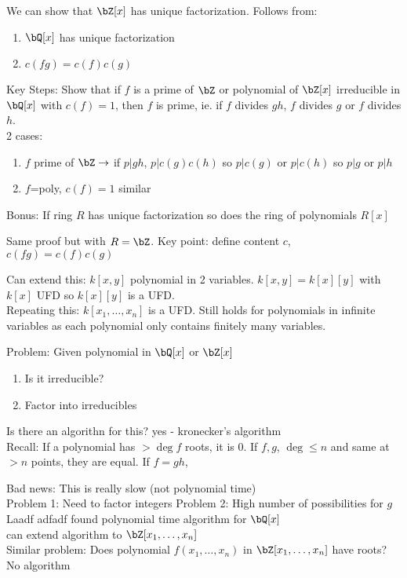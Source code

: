  \noindent
 We can show that $\bZ[x]$ has unique factorization. Follows from: 
 \begin{enumerate}
    \item $\bQ[x]$ has unique factorization 
    \item $c(fg)=c(f)c(g)$ 
 \end{enumerate}
Key Steps: Show that if $f$ is a prime of $\bZ$ or polynomial of $\bZ[x]$ irreducible in $\bQ[x]$ with $c(f)=1$, then $f$ is prime, ie. if $f$ divides $gh$, $f$ divides $g$ or $f$ divides $h$. \\
2 cases: 
\begin{enumerate}
    \item $f$ prime of $\bZ \to$ if $p|gh$, $p|c(g)c(h)$ so $p|c(g)$ or $p|c(h)$ so $p|g$ or $p|h$ 
    \item $f$=poly, $c(f)=1$ similar 
\end{enumerate}

\noindent
Bonus: If ring $R$ has unique factorization so does the ring of polynomials $R[x]$ 

\begin{pf}
    Same proof but with $R = \bZ$. Key point: define content $c$, $c(fg) = c(f)c(g)$ 
\end{pf}    

\noindent
Can extend this: $k[x,y]$ polynomial in 2 variables. $k[x,y] = k[x][y]$ with $k[x]$ UFD so $k[x][y]$ is a UFD. \\
Repeating this: $k[x_1, \ldots, x_n]$ is a UFD. Still holds for polynomials in infinite variables as each polynomial only contains finitely many variables. 

\noindent
Problem: Given polynomial in $\bQ[x]$ or $\bZ[x]$ 
\begin{enumerate}
    \item Is it irreducible? 
    \item Factor into irreducibles 
\end{enumerate}
Is there an algorithn for this? yes - kronecker's algorithm \\
Recall: If a polynomial has $> \deg f$ roots, it is 0. If $f,g$, $\deg \le n$ and same at $>n$ points, they are equal. If $f=gh$, 

Bad news: This is really slow (not polynomial time) \\
Problem 1: Need to factor integers 
Problem 2: High number of possibilities for $g$ \\
Laadf adfadf found polynomial time algorithm for $\bQ[x]$ \\
can extend algorithm to $\bZ[x_1, \ldots, x_n]$ \\
Similar problem: Does polynomial $f(x_1, \ldots, x_n)$ in $\bZ[x_1, \ldots, x_n]$ have roots? No algorithm 

